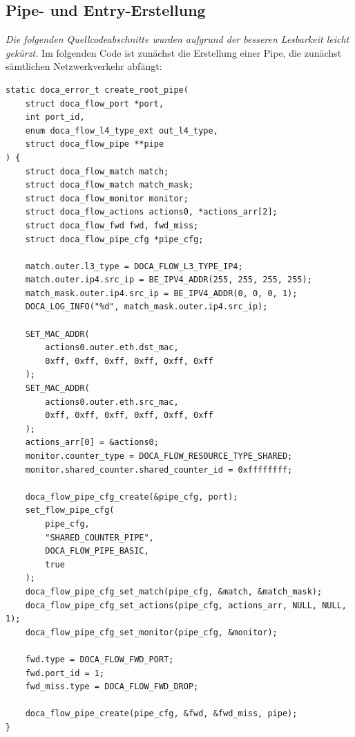 \subsection{Pipe- und Entry-Erstellung}
\textit{Die folgenden Quellcodeabschnitte wurden aufgrund der besseren Lesbarkeit leicht gekürzt.}
Im folgenden Code ist zunächst die Erstellung einer Pipe, die zunächst sämtlichen Netzwerkverkehr abfängt:
\begin{verbatim}
static doca_error_t create_root_pipe(
    struct doca_flow_port *port,
    int port_id,
    enum doca_flow_l4_type_ext out_l4_type,
    struct doca_flow_pipe **pipe
) {
    struct doca_flow_match match;
    struct doca_flow_match match_mask;
    struct doca_flow_monitor monitor;
    struct doca_flow_actions actions0, *actions_arr[2];
    struct doca_flow_fwd fwd, fwd_miss;
    struct doca_flow_pipe_cfg *pipe_cfg;
    
    match.outer.l3_type = DOCA_FLOW_L3_TYPE_IP4;
    match.outer.ip4.src_ip = BE_IPV4_ADDR(255, 255, 255, 255);
    match_mask.outer.ip4.src_ip = BE_IPV4_ADDR(0, 0, 0, 1);
    DOCA_LOG_INFO("%d", match_mask.outer.ip4.src_ip);
    
    SET_MAC_ADDR(
        actions0.outer.eth.dst_mac, 
        0xff, 0xff, 0xff, 0xff, 0xff, 0xff
    );
    SET_MAC_ADDR(
        actions0.outer.eth.src_mac, 
        0xff, 0xff, 0xff, 0xff, 0xff, 0xff
    );
    actions_arr[0] = &actions0;
    monitor.counter_type = DOCA_FLOW_RESOURCE_TYPE_SHARED;
    monitor.shared_counter.shared_counter_id = 0xffffffff;
    
    doca_flow_pipe_cfg_create(&pipe_cfg, port);
    set_flow_pipe_cfg(
        pipe_cfg, 
        "SHARED_COUNTER_PIPE", 
        DOCA_FLOW_PIPE_BASIC, 
        true
    );
    doca_flow_pipe_cfg_set_match(pipe_cfg, &match, &match_mask);
    doca_flow_pipe_cfg_set_actions(pipe_cfg, actions_arr, NULL, NULL, 1);
    doca_flow_pipe_cfg_set_monitor(pipe_cfg, &monitor);
    
    fwd.type = DOCA_FLOW_FWD_PORT;
    fwd.port_id = 1;
    fwd_miss.type = DOCA_FLOW_FWD_DROP;
    
    doca_flow_pipe_create(pipe_cfg, &fwd, &fwd_miss, pipe);
}
\end{verbatim}
